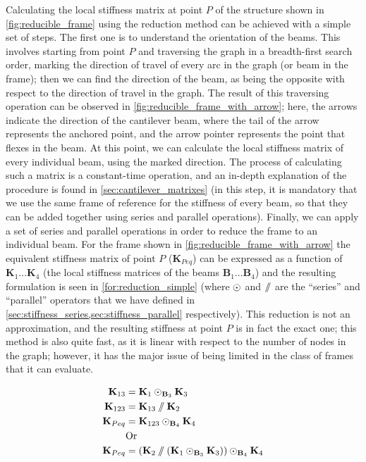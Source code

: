 Calculating the local stiffness matrix at point $P$ of the structure
shown in \cref{fig:reducible_frame} using the reduction method can be achieved with a 
simple set of steps. The first one is to understand the orientation of the beams. This involves
starting from point $P$ and traversing the graph in a breadth-first search order, marking the direction
of travel of every arc in the graph (or beam in the frame); then we can find the direction of the beam,
as being the opposite with respect to the direction of travel in the graph.
The result of this traversing operation can be observed in \cref{fig:reducible_frame_with_arrow}; here, the arrows indicate the direction of the cantilever beam, where the tail of the arrow
represents the anchored point, and the arrow pointer represents the point that flexes in the beam.
At this point, we can calculate the local stiffness matrix of every individual beam, using the marked
direction. The process of calculating such a matrix is a constant-time operation, and an in-depth
explanation of the procedure is found in \cref{sec:cantilever_matrixes} (in this step,
it is mandatory that we use the same frame of reference for the stiffness of every beam, so that
they can be added together using series and parallel operations).
Finally, we can apply a set of series and parallel operations in order to reduce the frame to 
an individual beam. For the frame shown in \cref{fig:reducible_frame_with_arrow}
the equivalent stiffness matrix of point $P$ ($\mathbf{K}_{Peq}$)
can be expressed as a function of $\mathbf{K}_1 \dots \mathbf{K}_4$ (the local stiffness matrices
of the beams $\mathbf{B}_1 \dots \mathbf{B}_4$) and the resulting formulation is seen in
\cref{for:reduction_simple} (where $\mathbin{\odot}$ and $\mathbin{/\mkern-6mu/}$ are the ``series''
and ``parallel'' operators that we have defined in \cref{sec:stiffness_series,sec:stiffness_parallel}
respectively). This reduction is not an approximation, and the resulting stiffness at point $P$ is in fact
the exact one; this method is also quite fast, as it is linear with respect to
the number of nodes in the graph; however, it has the major issue of being limited in the class
of frames that it can evaluate.


\begin{equation}
\begin{split}
    \mathbf{K}_{13} &= \mathbf{K}_1 \mathbin{\odot}_{\mathbf{B}_3} \mathbf{K}_3 \\
    \mathbf{K}_{123} &= \mathbf{K}_{13} \mathbin{/\mkern-6mu/} \mathbf{K}_2 \\
    \mathbf{K}_{Peq} &= \mathbf{K}_{123} \mathbin{\odot}_{\mathbf{B}_4} \mathbf{K}_4 \\
    &\text{Or} \\
    \mathbf{K}_{Peq} &= (\mathbf{K}_2 \mathbin{/\mkern-6mu/} (\mathbf{K}_1 \mathbin{\odot}_{\mathbf{B}_3} \mathbf{K}_3)) \mathbin{\odot}_{\mathbf{B}_4} \mathbf{K}_4 
\end{split}
\label{for:reduction_simple}
\end{equation}


